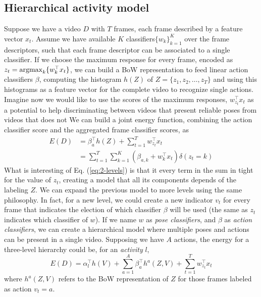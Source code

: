 \subsection{Hierarchical activity model}

Suppose we have a video $D$ with $T$ frames, each frame described by a feature vector $x_t$. Assume we have available $K$ classifiers$\{w_k\}_{k=1}^K$ over the frame descriptors, such that each frame descriptor can be associated to a single classifier. If we choose the maximum response for every frame, encoded as $z_t = \operatorname*{argmax}_k\{w_k^\top x_t\}$,  we can build a BoW representation to feed linear action classifiers $\beta$, computing the histogram $h(Z)$ of $Z = \{z_1,z_2,\dots,z_T\}$ and using this histograms as a feature vector for the complete video to recognize single actions. Imagine now we would like to use the scores of the maximum responses, $w_{z_t}^\top x_t$ as a potential to help discriminating between videos that present reliable poses from videos that does not We can build a joint energy function, combining the action classifier score and the aggregated frame classifier scores, as
\begin{equation}
\label{eq:2-levels}
\begin{split}
E(D) &= \beta_{a}^\top h(Z) + \sum_{t=1}^T w_{z_t}^\top x_t \\ & = \sum_{t=1}^T\sum_{k=1}^K\left(\beta_{a,k} + w_k^\top x_t \right)\delta(z_t=k)
\end{split}
\end{equation}
What is interesting of Eq. (\ref{eq:2-levels}) is that it every term in the sum in tight for the value of $z_t$, creating a model that all its components depends of the labeling $Z$. We can expand the previous model to more levels using the same philosophy. In fact, for a new level, we could create a new indicator $v_t$ for every frame that indicates the election of which classifier $\beta$ will be used (the same as $z_t$ indicates which classifier of $w$). If we name $w$ as \emph{pose classifiers}, and $\beta$ as \emph{action classifiers}, we can create a hierarchical model where multiple poses and actions can be present in a single video. Supposing we have $A$ actions, the energy for a three-level hierarchy could be, for an \emph{activity} $l$,
\begin{equation}
E(D) =\alpha_l^\top h(V) + \sum_{a=1}^A \beta_{a}^\top h^a(Z,V) + \sum_{t=1}^T w_{z_t}^\top x_t 
\end{equation}
where $h^a(Z,V)$ refers to the BoW representation of $Z$ for those frames labeled as action $v_t = a$.

